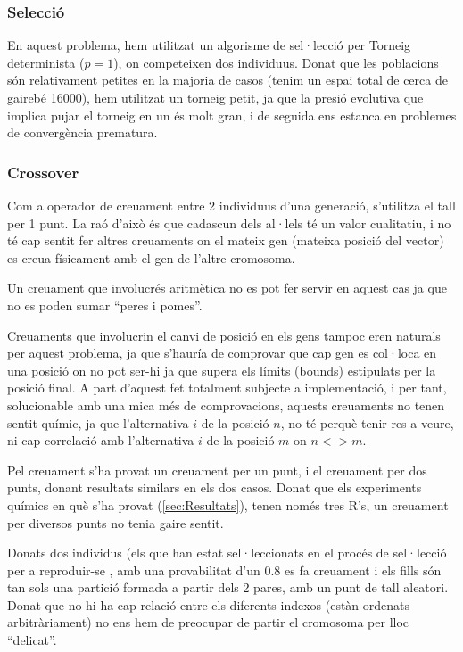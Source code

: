 \documentclass[titlepage,a4paper,12pt]{book}
\begin{document}

\subsubsection{Selecció} %
\label{ssub:CSeleccio}
En aquest problema, hem utilitzat un algorisme de sel·lecció per Torneig
determinista ($p=1$), on competeixen dos individuus.  Donat que les poblacions
són relativament petites en la majoria de casos (tenim un espai total de cerca
de gairebé 16000), hem utilitzat un torneig petit, ja que la presió evolutiva
que implica pujar el torneig en un és molt gran, i de seguida ens estanca en
problemes de convergència prematura.


\subsubsection{Crossover} %
\label{ssub:Crossover}

Com a operador de creuament entre 2 individuus d'una generació, s'utilitza el
tall per 1 punt.  La raó d'això és que cadascun dels al·lels té un valor
cualitatiu, i no té cap sentit fer altres creuaments on el mateix gen (mateixa
posició del vector) es creua físicament amb el gen de l'altre cromosoma.

Un creuament que involucrés aritmètica no es pot fer servir en aquest cas ja que
no es poden sumar ``peres i pomes''.

Creuaments que involucrin el canvi de posició en els gens tampoc eren naturals
per aquest problema, ja que s'hauría de comprovar que cap gen es col·loca en una
posició on no pot ser-hi ja que supera els límits (bounds) estipulats per la
posició final.  A part d'aquest fet totalment subjecte a implementació, i per
tant, solucionable amb una mica més de comprovacions, aquests creuaments no
tenen sentit químic, ja que l'alternativa $i$ de la posició $n$, no té perquè
tenir res a veure, ni cap correlació amb l'alternativa $i$ de la posició $m$ on
$n <> m$.

Pel creuament s'ha provat un creuament per un punt, i el creuament per dos
punts, donant resultats similars en els dos casos.  Donat que els experiments
químics en què s'ha provat (\ref{sec:Resultats}), tenen només tres R's, un
creuament per diversos punts no tenia gaire sentit.

Donats dos individus (els que han estat sel·leccionats en el procés de
sel·lecció per a reproduir-se , amb una provabilitat d'un 0.8 es fa creuament i
els fills són tan sols una partició formada a partir dels 2 pares, amb un punt
de tall aleatori.  Donat que no hi ha cap relació entre els diferents indexos
(estàn ordenats arbitràriament) no ens hem de preocupar de partir el cromosoma
per lloc ``delicat''. 
\end{document}
